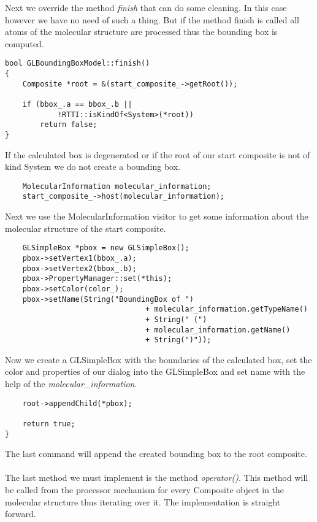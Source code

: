 Next we override the method {\em finish} that can do some cleaning. In this case
however we have no need of such a thing. But if the method finish is called
all atoms of the molecular structure are processed thus the bounding box is computed.

\begin{verbatim}
bool GLBoundingBoxModel::finish()
{
	Composite *root = &(start_composite_->getRoot());

	if (bbox_.a == bbox_.b ||
			!RTTI::isKindOf<System>(*root))
		return false;
}
\end{verbatim}

If the calculated box is degenerated or if the root of our start composite is
not of kind System we do not create a bounding box.

\begin{verbatim}
	MolecularInformation molecular_information;
	start_composite_->host(molecular_information);                        
\end{verbatim}

Next we use the MolecularInformation visitor to get some information about the
molecular structure of the start composite.

\begin{verbatim}
	GLSimpleBox *pbox = new GLSimpleBox();
	pbox->setVertex1(bbox_.a);
	pbox->setVertex2(bbox_.b);
	pbox->PropertyManager::set(*this);
	pbox->setColor(color_);
	pbox->setName(String("BoundingBox of ")
								+ molecular_information.getTypeName()
								+ String(" (")
								+ molecular_information.getName()
								+ String(")"));
\end{verbatim}

Now we create a GLSimpleBox with the boundaries of the calculated box, set the
color and properties of our dialog into the GLSimpleBox and set name with the help
of the {\em molecular\_information}.
																										 
\begin{verbatim}
	root->appendChild(*pbox);

	return true;
}
\end{verbatim}

The last command will append the created bounding box to the root composite.\\ \\

The last method we must implement is the method {\em operator()}. This method
will be called from the processor mechanism for every Composite object
in the molecular structure thus iterating over it.
The implementation is straight forward.

